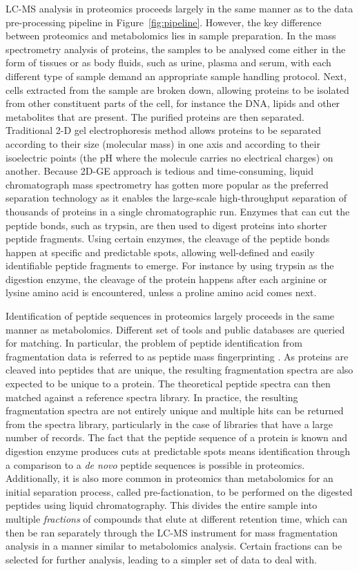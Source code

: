 LC-MS analysis in proteomics proceeds largely in the same manner as to the data pre-processing pipeline in Figure~\ref{fig:pipeline}. However, the key difference between proteomics and metabolomics lies in sample preparation. In the mass spectrometry analysis of proteins, the samples to be analysed come either in the form of tissues or as body fluids, such as urine, plasma and serum, with each different type of sample demand an appropriate sample handling protocol. Next, cells extracted from the sample are broken down, allowing proteins to be isolated from other constituent parts of the cell, for instance the DNA, lipids and other metabolites that are present. The purified proteins are then separated. Traditional 2-D gel electrophoresis method allows proteins to be separated according to their size (molecular mass) in one axis and according to their isoelectric points (the pH where the molecule carries no electrical charges) on another. Because 2D-GE approach is tedious and time-consuming, liquid chromatograph mass spectrometry has gotten more popular as the preferred separation technology as it enables the large-scale high-throughput separation of thousands of proteins in a single chromatographic run. Enzymes that can cut the peptide bonds, such as trypsin, are then used to digest proteins into shorter peptide fragments. Using certain enzymes, the cleavage of the peptide bonds happen at specific and predictable spots, allowing well-defined and easily identifiable peptide fragments to emerge. For instance by using trypsin as the digestion enzyme, the cleavage of the protein happens after each arginine or lysine amino acid is encountered, unless a proline amino acid comes next. 

Identification of peptide sequences in proteomics largely proceeds in the same manner as metabolomics. Different set of tools and public databases are queried for matching. In particular, the problem of peptide identification from fragmentation data is referred to as peptide mass fingerprinting \cite{Sandin2014}. As proteins are cleaved into peptides that are unique, the resulting fragmentation spectra are also expected to be unique to a protein. The theoretical peptide spectra can then matched against a reference spectra library. In practice, the resulting fragmentation spectra are not entirely unique and multiple hits can be returned from the spectra library, particularly in the case of libraries that have a large number of records. The fact that the peptide sequence of a protein is known and digestion enzyme produces cuts at predictable spots means identification through a comparison to a \textit{de novo} peptide sequences is possible in proteomics. Additionally, it is also more common in proteomics than metabolomics for an initial separation process, called pre-factionation, to be performed on the digested peptides using liquid chromatography. This divides the entire sample into multiple \emph{fractions} of compounds that elute at different retention time, which can then be ran separately through the LC-MS instrument for mass fragmentation analysis in a manner similar to metabolomics analysis. Certain fractions can be selected for further analysis, leading to a simpler set of data to deal with.

